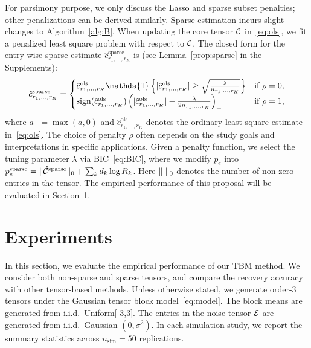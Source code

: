 \documentclass{article}
\begin{document}
For parsimony purpose, we only discuss the Lasso and sparse subset penalties; other penalizations can be derived similarly. Sparse estimation incurs slight changes to Algorithm~\ref{alg:B}. When updating the core tensor $\mathcal{C}$ in~\eqref{eq:ols}, we fit a penalized least square problem with respect to $\mathcal{C}$. 
The closed form for the entry-wise sparse estimate $\hat c^{\text{sparse}}_{r_1,\ldots,r_K}$ is (see Lemma~\ref{prop:sparse} in the Supplements):
\begin{equation}\label{eq:lasso}
\hat c^{\text{sparse}}_{r_1,\ldots,r_K}=
\begin{cases}
\hat c^{\text{ols}}_{r_1,\ldots,r_K}\mathds{1}\left\{|\hat c^{\text{ols}}_{r_1,\ldots,r_K} |\geq {\sqrt{\lambda \over n_{r_1,\ldots,r_K}}}\right\} & \text{if}\ \rho=0,\\
\text{sign}(\hat c^{\text{ols}}_{r_1,\ldots,r_K})\left(| \hat c^{\text{ols}}_{r_1,\ldots,r_K}|-{\lambda \over 2n_{r_1,\ldots,r_K}}  \right)_{+} &\text{if}\ \rho=1,
\end{cases}
\end{equation}
where $a_{+}=\max(a,0)$ and $\hat c^{\text{ols}}_{r_1,\ldots,r_K}$ denotes the ordinary least-square estimate in~\eqref{eq:ols}. The choice of penalty $\rho$ often depends on the study goals and interpretations in specific applications. Given a penalty function, we select the tuning parameter $\lambda$ via BIC~\eqref{eq:BIC}, where we modify $p_e$ into $p^{\text{sparse}}_e=\lVert\hat {\mathcal{C}}^{\text{sparse}}\rVert_0+\sum_kd_k\log R_k$. Here $\lVert\cdot\rVert_0$ denotes the number of non-zero entries in the tensor. The empirical performance of this proposal will be evaluated in Section~\ref{sec:simulation}. 

\vspace{-.2cm}
\section{Experiments}\label{sec:simulation}
\vspace{-.2cm}
In this section, we evaluate the empirical performance of our TBM method. We consider both non-sparse and sparse tensors, and compare the recovery accuracy with other tensor-based methods. Unless otherwise stated, we generate order-3 tensors under the Gaussian tensor block model~\eqref{eq:model}. The block means are generated from  i.i.d.\ Uniform[-3,3]. The entries in the noise tensor $\mathcal{E}$ are generated from i.i.d.\ Gaussian $(0,\sigma^2)$. In each simulation study, we report the summary statistics across $n_{\text{sim}}=50$ replications. 
\end{document}
